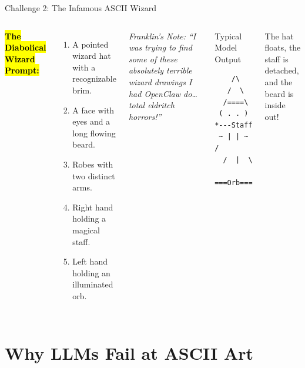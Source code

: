 \documentclass[aspectratio=169,11pt,xcolor={table,dvipsnames}]{beamer}
\begin{document}
\begin{frame}[fragile]{Challenge 2: The Infamous ASCII Wizard}
  \begin{columns}[T]
      \textbf{\hl{The Diabolical Wizard Prompt:}}
      \begin{enumerate}
        \item A pointed wizard hat with a recognizable brim.
        \item A face with eyes and a long flowing beard.
        \item Robes with two distinct arms.
        \item Right hand holding a magical staff.
        \item Left hand holding an illuminated orb.
      \end{enumerate}

      \vspace{0.25cm}
      \footnotesize\textcolor{accentamber}{\textit{Franklin's Note: ``I was trying to find some of these absolutely terrible wizard drawings I had OpenClaw do\dots{} total eldritch horrors!''}}%

      \begin{exampleblock}{Typical Model Output}
\begin{lstlisting}
    /\
   /  \
  /====\
 ( . . )  *---Staff
 ~ | | ~ /
  /  |  \
  ===Orb===
\end{lstlisting}
      \end{exampleblock}
      \vspace{0.1cm}
      \footnotesize The hat floats, the staff is detached, and the beard is inside out!
  \end{columns}
\end{frame}

\section{Why LLMs Fail at ASCII Art}
\end{document}

